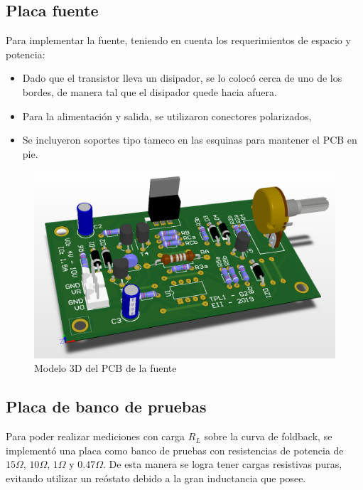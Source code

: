 \subsection{Placa fuente}

Para implementar la fuente, teniendo en cuenta los requerimientos de espacio y potencia:

\begin{itemize}
\item Dado que el transistor lleva un disipador, se lo coloc\'o cerca de uno de los bordes, de manera tal que el disipador quede hacia afuera.
\item Para la alimentaci\'on y salida, se utilizaron conectores polarizados,
\item Se incluyeron soportes tipo tameco en las esquinas para mantener el PCB en pie.
\end{itemize}

\begin{figure}[!ht]
\begin{centering}
\includegraphics[scale=0.45]{Imagenes/Fuente3D.png}
\par\end{centering}
\caption{Modelo 3D del PCB de la fuente}

\end{figure}

\subsection{Placa de banco de pruebas}

Para poder realizar mediciones con carga $R_L$ sobre la curva de foldback, se implement\'o una placa como banco de pruebas con resistencias de potencia de $15\Omega$, $10\Omega$, $1\Omega$ y $0.47\Omega$. De esta manera se logra tener cargas resistivas puras, evitando utilizar un re\'ostato debido a la gran inductancia que posee.

